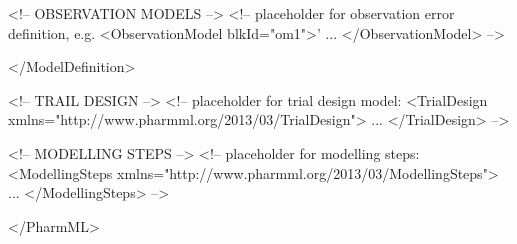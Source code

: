 \documentclass[a4paper,10pt]{article}
\begin{document}
\begin{xmlcode}
        
        <!-- OBSERVATION MODELS -->
        <!-- placeholder for observation error definition, e.g. 
            <ObservationModel blkId="om1">' 
                ...
            </ObservationModel> 
        -->
        
    </ModelDefinition>
    
    <!-- TRAIL DESIGN -->
    <!-- placeholder for trial design model:
        <TrialDesign xmlns="http://www.pharmml.org/2013/03/TrialDesign">
            ...
        </TrialDesign>
    -->
    
    <!-- MODELLING STEPS -->
    <!-- placeholder for modelling steps:
        <ModellingSteps xmlns="http://www.pharmml.org/2013/03/ModellingSteps">
            ...
        </ModellingSteps>
    -->

</PharmML>
\end{xmlcode}









\end{document}
